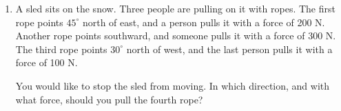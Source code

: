 \documentclass[12pt]{article}
\begin{document}
\begin{enumerate}
%
%
%
%
%
%
%

\item A sled sits on the snow. Three people are pulling on it with ropes. The first rope points $45^\circ$ north of east, and a person pulls it with a force of 200 N.
Another rope points southward, and someone pulls it with a force of 300 N. The third rope points $30^\circ$ north of west, and the last person pulls it with a force of
100 N.

You would like to stop the sled from moving. In which direction, and with what force, should you pull the fourth rope?


\end{enumerate}
\end{document}
